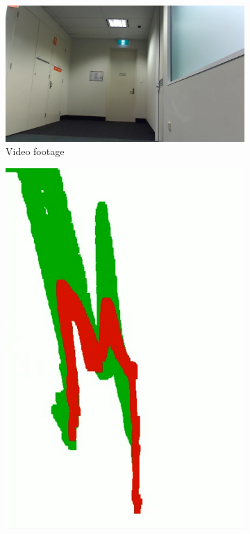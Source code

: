 \begin{figure}[b]
    \centering
    \begin{subfigure}{.5\textwidth}
        \centering
        \includegraphics[width=\linewidth]{images/pcloud_indoor_comparison.PNG}
        \caption{Video footage}
    \end{subfigure}
    \quad
    \begin{subfigure}{.2\textwidth}
        \centering
        \includegraphics[width=\linewidth]{images/pcloud_indoor_performance.PNG}

\end{subfigure}
\end{figure}

